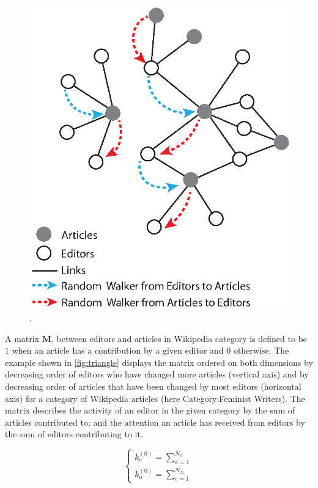 \begin{figure}[!t]
\centering
\includegraphics[width=0.7\columnwidth]{Figures/bi-partite_net.eps}.
\caption{}
\label{fig:convergence}
\end{figure}


A matrix $\mathbf{M}$, between editors and articles in Wikipedia category is defined to be $1$ when an article has a contribution by a given editor and $0$ otherwise. The example shown in \ref{fig:triangle} displays the matrix ordered on both dimensions by decreasing order of editors who have changed more articles (vertical axis) and by decreasing order of articles that have been changed by most editors (horizontal axis) for a category of Wikipedia articles (here Category:Feminist Writers). The matrix describes the activity of an editor in the given category by the sum of articles contributed to; and the attention an article has received from editors by the sum of editors contributing to it. 

\begin{equation}
\begin{cases}
 k_{e}^{(0)} = \sum_{a=1}^{N_{a}}\\
 k_{a}^{(0)} = \sum_{e=1}^{N_{N_{e}}}
\end{cases}
\label{HHinit}
\end{equation}

